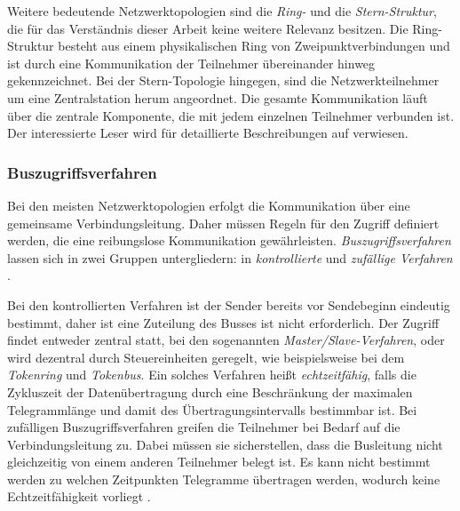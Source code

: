 Weitere bedeutende Netzwerktopologien sind die \textit{Ring-} und die \textit{Stern-Struktur}, die für das Verständnis dieser Arbeit keine weitere Relevanz besitzen.
Die Ring-Struktur besteht aus einem physikalischen Ring von Zweipunktverbindungen und ist durch eine Kommunikation der Teilnehmer übereinander hinweg gekennzeichnet.
Bei der Stern-Topologie hingegen, sind die Netzwerkteilnehmer um eine Zentralstation herum angeordnet. Die gesamte Kommunikation läuft über die zentrale Komponente, die mit jedem einzelnen Teilnehmer verbunden ist. Der interessierte Leser wird für detaillierte Beschreibungen auf \cite{schn06} verwiesen.

\subsubsection{Buszugriffsverfahren}

Bei den meisten Netzwerktopologien erfolgt die Kommunikation  über eine gemeinsame Verbindungsleitung. Daher müssen Regeln für den Zugriff definiert werden, die eine reibungslose Kommunikation gewährleisten. \textit{Buszugriffsverfahren} lassen sich in zwei Gruppen untergliedern: in \textit{kontrollierte} und \textit{zufällige Verfahren} \cite[S.~19]{schn06}.

Bei den kontrollierten Verfahren ist der Sender bereits vor Sendebeginn eindeutig bestimmt, daher ist eine Zuteilung des Busses ist nicht erforderlich. Der Zugriff findet entweder zentral statt, bei den sogenannten \textit{Master/Slave-Verfahren}, oder wird dezentral durch Steuereinheiten geregelt, wie beispielsweise bei dem \textit{Tokenring} und \textit{Tokenbus}. Ein solches Verfahren heißt \textit{echtzeitfähig}, falls die Zykluszeit der Datenübertragung durch eine Beschränkung der maximalen Telegrammlänge und damit des Übertragungsintervalls bestimmbar ist.
Bei zufälligen Buszugriffsverfahren greifen die Teilnehmer bei Bedarf auf die Verbindungsleitung zu. Dabei müssen sie sicherstellen, dass die Busleitung nicht gleichzeitig von einem anderen Teilnehmer belegt ist. Es kann nicht bestimmt werden zu welchen Zeitpunkten Telegramme übertragen werden, wodurch keine Echtzeitfähigkeit vorliegt \cite[S.~19]{schn06}.

